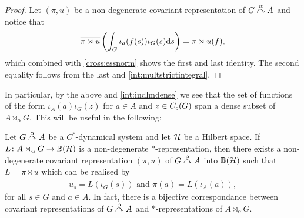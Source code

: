 \begin{proof}
	Let $(\pi, u)$ be a non-degenerate covariant representation of $G \stackrel{\alpha}{\curvearrowright} A$ and notice that
	\begin{align*}
		\overline{\pi \rtimes u}\left( \int_G \iota_a(f(s)) \iota_G(s) \mathrm{d} s  \right) = \pi \rtimes u (f),
	\end{align*}
	which combined with \cref{cross:essnorm} shows the first and last identity. The second equality follows from the last and  \cref{int:multstrictintegral}.
\end{proof}
\begin{remark}
In particular, by the above and \cref{int:indlmdense} we see that the set of functions of the form $\iota_A(a) \iota_G(z)$ for $a \in A$ and $z \in C_c(G)$ span a dense subset of $A \rtimes_\alpha G$. This will be useful in the following:
\end{remark}
\begin{theorem}
	Let $G \stackrel{\alpha}{\curvearrowright} A$ be a $C ^*$-dynamical system and let $\mathcal{H}$ be a Hilbert space. If $L \colon A \rtimes_\alpha G \to \mathbb{B}(\mathcal{H})$ is a non-degenerate $*$-representation, then there exists a non-degenerate covariant representation $(\pi,u)$ of $G \stackrel{\alpha}{\curvearrowright} A$ into $ \mathbb{B}(\mathcal{H})$ such that $L= \pi \rtimes u$ which can be realised by 
	\begin{align*}
		u_s = \overline L(\iota_G(s)) \text{ and } \pi(a) = \overline L(\iota_A(a)),
	\end{align*}
	for all $s \in G$ and $a \in A$. In fact, there is a bijective correspondance between covariant representations of $G \stackrel{\alpha}{\curvearrowright} A$ and $*$-representations of $A \rtimes_\alpha G$.
	\label{cross:onetoonecor}
\end{theorem}
